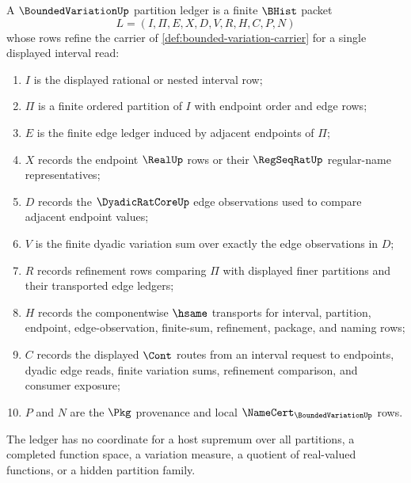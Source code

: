 \begin{definition}
\label{def:bounded-variation-partition-ledger}
A $\BoundedVariationUp$ partition ledger is a finite $\BHist$ packet
$$
L=(I,\Pi,E,X,D,V,R,H,C,P,N)
$$
whose rows refine the carrier of \autoref{def:bounded-variation-carrier} for a
single displayed interval read:
\begin{enumerate}
\item $I$ is the displayed rational or nested interval row;
\item $\Pi$ is a finite ordered partition of $I$ with endpoint order and edge rows;
\item $E$ is the finite edge ledger induced by adjacent endpoints of $\Pi$;
\item $X$ records the endpoint $\RealUp$ rows or their $\RegSeqRatUp$ regular-name representatives;
\item $D$ records the $\DyadicRatCoreUp$ edge observations used to compare adjacent endpoint values;
\item $V$ is the finite dyadic variation sum over exactly the edge observations in $D$;
\item $R$ records refinement rows comparing $\Pi$ with displayed finer partitions and their transported edge ledgers;
\item $H$ records the componentwise $\hsame$ transports for interval, partition, endpoint, edge-observation, finite-sum, refinement, package, and naming rows;
\item $C$ records the displayed $\Cont$ routes from an interval request to endpoints, dyadic edge reads, finite variation sums, refinement comparison, and consumer exposure;
\item $P$ and $N$ are the $\Pkg$ provenance and local $\NameCert_{\BoundedVariationUp}$ rows.
\end{enumerate}
The ledger has no coordinate for a host supremum over all partitions, a
completed function space, a variation measure, a quotient of real-valued
functions, or a hidden partition family.
\end{definition}

